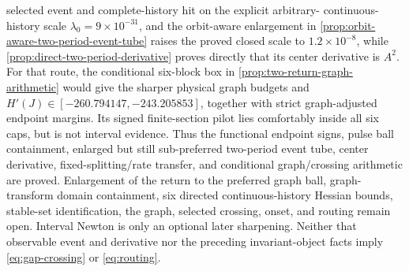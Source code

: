 selected event and complete-history hit on the explicit arbitrary-
continuous-history scale \(\lambda_0=9\times10^{-31}\), and the orbit-aware
enlargement in \cref{prop:orbit-aware-two-period-event-tube} raises the
proved closed scale to \(1.2\times10^{-8}\), while
\cref{prop:direct-two-period-derivative} proves directly that its center
derivative is \(A^2\).  For that route, the conditional six-block box in
\cref{prop:two-return-graph-arithmetic} would give the sharper physical graph
budgets and
\(H'(J)\in[-260.794147,-243.205853]\), together with strict graph-adjusted
endpoint margins.  Its signed finite-section pilot lies comfortably inside
all six caps, but is not interval evidence.  Thus the functional endpoint
signs, pulse ball containment, enlarged but still sub-preferred two-period
event tube, center
derivative, fixed-splitting/rate transfer, and conditional graph/crossing
arithmetic are proved.  Enlargement of the return to the preferred graph
ball, graph-transform domain containment, six directed continuous-history
Hessian bounds, stable-set identification, the graph, selected crossing,
onset, and routing remain open.  Interval Newton is only an optional later
sharpening.
Neither that observable event and derivative nor the preceding
invariant-object facts
imply \cref{eq:gap-crossing} or \cref{eq:routing}.
